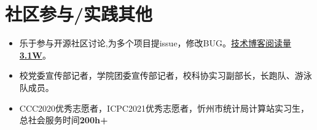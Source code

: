 \documentclass{resume}
\begin{document}
\section{社区参与/实践其他}
\begin{itemize}[parsep=0.2ex]
  \item 乐于参与开源社区讨论,为多个项目提issue，修改BUG。\href{https://blog.csdn.net/prinTao?type=blog}{技术博客阅读量\textbf{3.1W}}。
  \item 校党委宣传部记者，学院团委宣传部记者，校科协实习副部长，长跑队、游泳队成员。
  \item CCC2020优秀志愿者，ICPC2021优秀志愿者，忻州市统计局计算站实习生，总社会服务时间\textbf{200h+}
\end{itemize}

%
%
\end{document}
